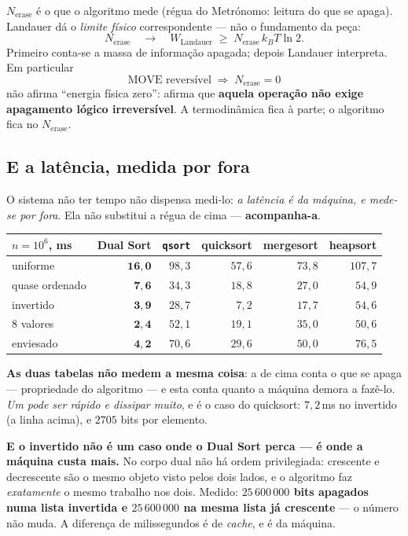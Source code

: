 \documentclass[11pt,a4paper]{article}
\newcommand{\code}[1]{\texttt{\small #1}}
\begin{document}
$N_{\mathrm{erase}}$ é o que o algoritmo mede (régua do Metrónomo: leitura do que se apaga).
Landauer dá o \emph{limite físico} correspondente --- não o fundamento da peça:
\[
  N_{\mathrm{erase}}
  \quad\longrightarrow\quad
  W_{\mathrm{Landauer}}
  \;\ge\;
  N_{\mathrm{erase}}\,k_{B}T\ln 2 .
\]
Primeiro conta-se a massa de informação apagada; depois Landauer interpreta. Em particular
\[
  \boxed{\;\mathrm{MOVE}\text{ reversível}\;\Longrightarrow\;N_{\mathrm{erase}}=0\;}
\]
não afirma ``energia física zero'': afirma que \textbf{aquela operação não exige apagamento
lógico irreversível}. A termodinâmica fica à parte; o algoritmo fica no $N_{\mathrm{erase}}$.

\subsection*{E a latência, medida por fora}

O sistema não ter tempo não dispensa medi-lo: \emph{a latência é da máquina, e mede-se por fora}.
Ela não substitui a régua de cima --- \textbf{acompanha-a}.

\begin{center}\small
\begin{tabular}{@{}lrrrrr@{}}
\toprule
$n=10^{6}$, ms & \textbf{Dual Sort} & \code{qsort} & quicksort & mergesort & heapsort \\
\midrule
uniforme        & $\mathbf{16{,}0}$ & $98{,}3$ & $57{,}6$ & $73{,}8$ & $107{,}7$ \\
quase ordenado  & $\mathbf{7{,}6}$ & $34{,}3$ & $18{,}8$ & $27{,}0$ & $54{,}9$ \\
invertido       & $\mathbf{3{,}9}$ & $28{,}7$ & $7{,}2$ & $17{,}7$ & $54{,}6$ \\
$8$ valores     & $\mathbf{2{,}4}$ & $52{,}1$ & $19{,}1$ & $35{,}0$ & $50{,}6$ \\
enviesado       & $\mathbf{4{,}2}$ & $70{,}6$ & $29{,}6$ & $50{,}0$ & $76{,}5$ \\
\bottomrule
\end{tabular}
\end{center}

\noindent \textbf{As duas tabelas não medem a mesma coisa}: a de cima conta o que se apaga ---
propriedade do algoritmo --- e esta conta quanto a máquina demora a fazê-lo. \emph{Um pode ser
rápido e dissipar muito}, e é o caso do quicksort: $7{,}2$\,ms no invertido (a linha acima), e $2705$
bits por elemento.

\smallskip
\noindent \textbf{E o invertido não é um caso onde o Dual Sort perca --- é onde a máquina custa
mais.} No corpo dual não há ordem privilegiada: crescente e decrescente são o mesmo objeto visto
pelos dois lados, e o algoritmo faz \emph{exatamente} o mesmo trabalho nos dois. Medido:
\textbf{$25\,600\,000$ bits apagados numa lista invertida e $25\,600\,000$ na mesma lista já
crescente} --- o número não muda. A diferença de milissegundos é de \emph{cache}, e é da máquina.
\end{document}
